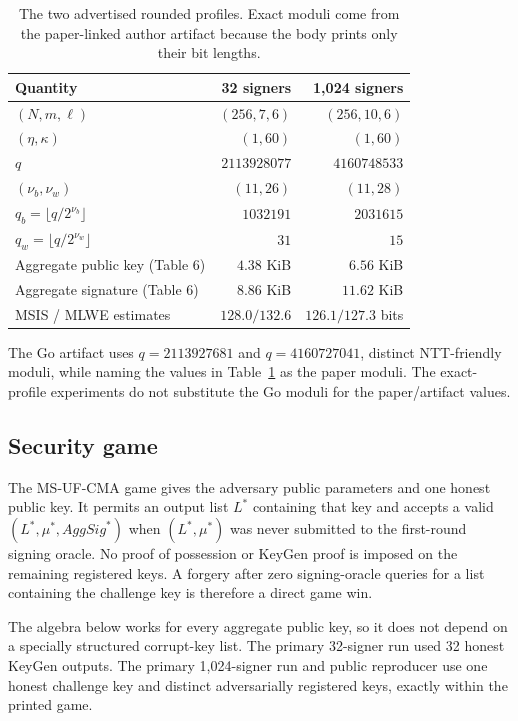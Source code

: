 \documentclass[10pt,a4paper]{article}
\begin{document}
\begin{table}[ht]
\centering
\small
\begin{tabular}{@{}lrr@{}}
\toprule
Quantity & 32 signers & 1,024 signers \\
\midrule
$(N,m,\ell)$ & $(256,7,6)$ & $(256,10,6)$ \\
$(\eta,\kappa)$ & $(1,60)$ & $(1,60)$ \\
$q$ & $2113928077$ & $4160748533$ \\
$(\nu_b,\nu_w)$ & $(11,26)$ & $(11,28)$ \\
$q_b=\lfloor q/2^{\nu_b}\rfloor$ & $1032191$ & $2031615$ \\
$q_w=\lfloor q/2^{\nu_w}\rfloor$ & $31$ & $15$ \\
Aggregate public key (Table 6) & $4.38$ KiB & $6.56$ KiB \\
Aggregate signature (Table 6) & $8.86$ KiB & $11.62$ KiB \\
MSIS / MLWE estimates & $128.0/132.6$ & $126.1/127.3$ bits \\
\bottomrule
\end{tabular}
\caption{The two advertised rounded profiles. Exact moduli come from the
paper-linked author artifact because the body prints only their bit lengths.}
\label{tab:profiles}
\end{table}

The Go artifact uses $q=2113927681$ and $q=4160727041$, distinct
NTT-friendly moduli, while naming the values in Table~\ref{tab:profiles} as
the paper moduli. The exact-profile experiments do not substitute the Go
moduli for the paper/artifact values.

\subsection{Security game}

The MS-UF-CMA game gives the adversary public parameters and one honest public
key. It permits an output list $L^*$ containing that key and accepts a valid
$(L^*,\mu^*,\mathit{AggSig}^*)$ when $(L^*,\mu^*)$ was never submitted to the
first-round signing oracle. No proof of possession or KeyGen proof is imposed
on the remaining registered keys. A forgery after zero signing-oracle queries for a
list containing the challenge key is therefore a direct game win.

The algebra below works for every aggregate public key, so it does not depend
on a specially structured corrupt-key list. The primary 32-signer run used 32
honest KeyGen outputs. The primary 1,024-signer run and public
reproducer use one honest challenge key and distinct adversarially registered
keys, exactly within the printed game.
\end{document}
